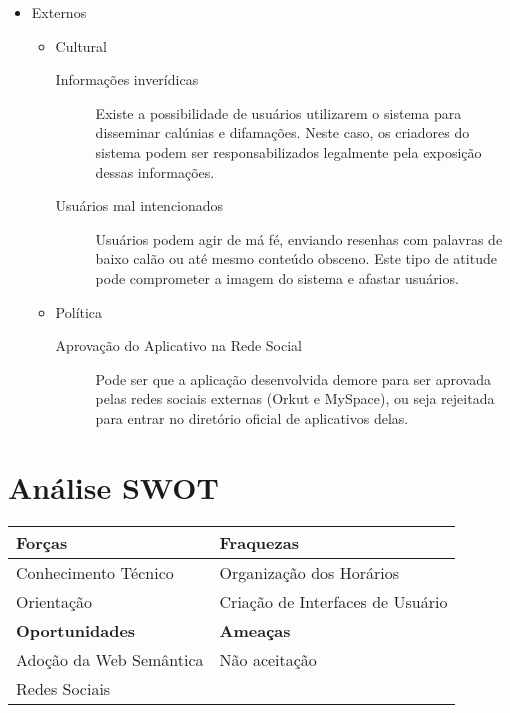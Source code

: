 \documentclass[]{article}
\begin{document}
\begin{itemize}
  \item Externos
  \begin{itemize}
    
    \item Cultural
    \begin{description}
      \item[Informações inverídicas] Existe a possibilidade de usuários utilizarem o sistema para disseminar calúnias e difamações. Neste caso, os criadores do sistema podem ser responsabilizados legalmente pela exposição dessas informações.
      \item[Usuários mal intencionados] Usuários podem agir de má fé, enviando resenhas com palavras de baixo calão ou até mesmo conteúdo obsceno. Este tipo de atitude pode comprometer a imagem do sistema e afastar usuários.
    \end{description}
    
    \item Política
    \begin{description}
      \item[Aprovação do Aplicativo na Rede Social] Pode ser que a aplicação desenvolvida demore para ser aprovada pelas redes sociais externas (Orkut e MySpace), ou seja rejeitada para entrar no diretório oficial de aplicativos delas.
    \end{description}
  \end{itemize}
  
\end{itemize}


\section{Análise SWOT} %
\label{sec:analise_swot}
\begin{center}
\begin{tabular}{|l|l|}
\hline
\textbf{Forças} & \textbf{Fraquezas}\\
\hline
Conhecimento Técnico & Organização dos Horários\\
Orientação & Criação de Interfaces de Usuário\\
\hline
\textbf{Oportunidades} & \textbf{Ameaças}\\
\hline
Adoção da Web Semântica & Não aceitação\\
Redes Sociais &  \\
\hline

\end{tabular}
\end{center}
\end{document}
